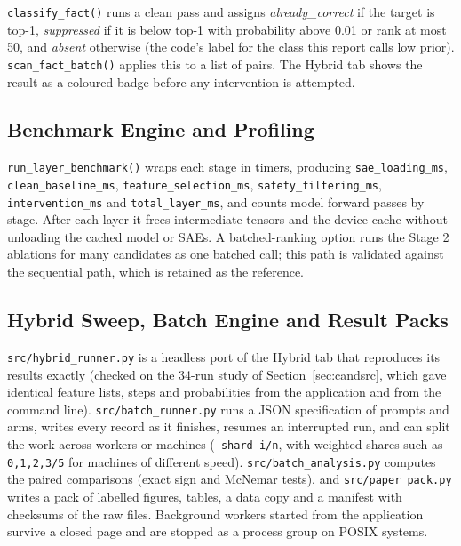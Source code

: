 \documentclass[12pt,a4paper]{report}
\begin{document}
\texttt{classify\_\allowbreak{}fact()} runs a clean pass and assigns \textit{already\_correct} if the target is top-1, \textit{suppressed} if it is below top-1 with probability above 0.01 or rank at most 50, and \textit{absent} otherwise (the code's label for the class this report calls low prior). \texttt{scan\_\allowbreak{}fact\_\allowbreak{}batch()} applies this to a list of pairs. The Hybrid tab shows the result as a coloured badge before any intervention is attempted.

\subsection{Benchmark Engine and Profiling}

\texttt{run\_\allowbreak{}layer\_\allowbreak{}benchmark()} wraps each stage in timers, producing \texttt{sae\_loading\_ms}, \texttt{clean\_baseline\_ms}, \texttt{feature\_selection\_ms}, \texttt{safety\_filtering\_ms}, \texttt{intervention\_ms} and \texttt{total\_layer\_ms}, and counts model forward passes by stage. After each layer it frees intermediate tensors and the device cache without unloading the cached model or SAEs. A batched-ranking option runs the Stage 2 ablations for many candidates as one batched call; this path is validated against the sequential path, which is retained as the reference.

\subsection{Hybrid Sweep, Batch Engine and Result Packs}

\texttt{src/\allowbreak{}hybrid\_\allowbreak{}runner.\allowbreak{}py} is a headless port of the Hybrid tab that reproduces its results exactly (checked on the 34-run study of Section~\ref{sec:candsrc}, which gave identical feature lists, steps and probabilities from the application and from the command line). \texttt{src/\allowbreak{}batch\_\allowbreak{}runner.\allowbreak{}py} runs a JSON specification of prompts and arms, writes every record as it finishes, resumes an interrupted run, and can split the work across workers or machines (\texttt{--shard i/\allowbreak{}n}, with weighted shares such as \texttt{0,1,2,3/\allowbreak{}5} for machines of different speed). \texttt{src/\allowbreak{}batch\_\allowbreak{}analysis.\allowbreak{}py} computes the paired comparisons (exact sign and McNemar tests), and \texttt{src/\allowbreak{}paper\_\allowbreak{}pack.\allowbreak{}py} writes a pack of labelled figures, tables, a data copy and a manifest with checksums of the raw files. Background workers started from the application survive a closed page and are stopped as a process group on POSIX systems.
\end{document}
